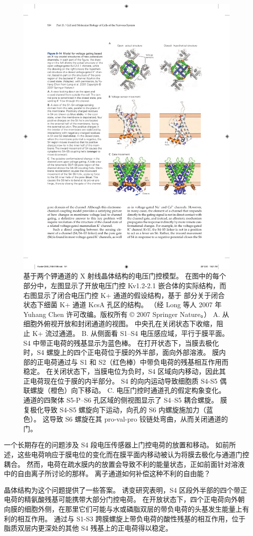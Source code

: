 \begin{figure}[htbp]
	\centering
	\includegraphics[width=0.6\linewidth]{chap08/fig_8_14}
	\caption{基于两个钾通道的 X 射线晶体结构的电压门控模型。 在图中的每个部分中，左图显示了开放电压门控 Kv1.2-2.1 嵌合体的实际结构，而右图显示了闭合电压门控 K+ 通道的假设结构，基于 部分关于闭合状态下细菌 K+ 通道 KcsA 孔区的结构。 （经 Long 等人 2007 年 Yuhang Chen 许可改编。版权所有 © 2007 Springer Nature。） A. 从细胞外俯视开放和封闭通道的视图。 中央孔在关闭状态下收缩，阻止 K+ 流过通道。 B. 从侧面看 S1–S4 电压感应域，平行于膜平面。 S4 中带正电荷的残基显示为蓝色棒。 在打开状态下，当膜去极化时，S4 螺旋上的四个正电荷位于膜的外半部，面向外部溶液。 膜内部的正电荷通过与 S1 和 S2（红色棒）中带负电荷的残基相互作用而稳定。 在关闭状态下，当膜电位为负时，S4 区域向内移动，因此其正电荷现在位于膜的内半部分。 S4 的向内运动导致细胞质 S4-S5 偶联螺旋（橙色）向下移动。 C. 电压门控时通道孔的假定构象变化。 通道的四聚体 S5-P–S6 孔区域的侧视图显示了 S4–S5 耦合螺旋。 膜复极化导致 S4-S5 螺旋向下运动，向孔的 S6 内螺旋施加力（蓝色）。 这导致 S6 螺旋在其 pro-val-pro 铰链处弯曲，从而关闭通道的门。}
	\label{fig:8_14}
\end{figure}


一个长期存在的问题涉及 S4 段电压传感器上门控电荷的放置和移动。
如前所述，这些电荷响应于膜电位的变化而在膜平面内移动被认为将膜去极化与通道门控耦合。
然而，电荷在疏水膜内的放置会导致不利的能量状态，正如前面针对溶液中的自由离子所讨论的那样。
离子通道如何补偿这种不利的自由能？


晶体结构为这个问题提供了一些答案。
诱变研究表明，S4 区段外半部的四个带正电荷的精氨酸残基可能携带大部分门控电荷。
在开放状态下，四个正电荷向外朝向膜的细胞外侧，在那里它们可能与水或磷脂双层的带负电荷的头基发生能量上有利的相互作用。
通过与 S1-S3 跨膜螺旋上带负电荷的酸性残基的相互作用，位于脂质双层内更深处的其他 S4 残基上的正电荷得以稳定。


